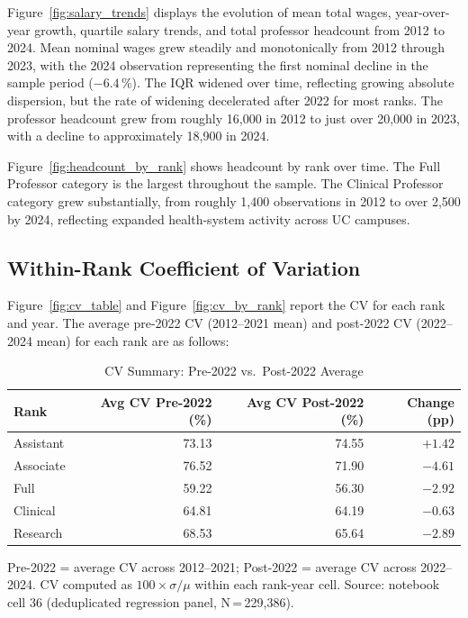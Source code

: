 \documentclass[12pt]{article}
\begin{document}
Figure~\ref{fig:salary_trends} displays the evolution of mean total
wages, year-over-year growth, quartile salary trends, and total professor
headcount from 2012 to 2024. Mean nominal wages grew steadily and
monotonically from 2012 through 2023, with the 2024 observation
representing the first nominal decline in the sample period ($-6.4$\,\%).
The IQR widened over time, reflecting growing absolute dispersion, but
the rate of widening decelerated after 2022 for most ranks. The
professor headcount grew from roughly 16,000 in 2012 to just over 20,000
in 2023, with a decline to approximately 18,900 in 2024.

Figure~\ref{fig:headcount_by_rank} shows headcount by rank over time.
The Full Professor category is the largest throughout the sample. The
Clinical Professor category grew substantially, from roughly 1,400
observations in 2012 to over 2,500 by 2024, reflecting expanded
health-system activity across UC campuses.

\subsection{Within-Rank Coefficient of Variation}
\label{subsec:cv}

Figure~\ref{fig:cv_table} and Figure~\ref{fig:cv_by_rank} report the CV for
each rank and year. The average pre-2022 CV (2012--2021 mean) and
post-2022 CV (2022--2024 mean) for each rank are as follows:

\begin{table}[H]
\centering
\caption{CV Summary: Pre-2022 vs.\ Post-2022 Average}
\label{tab:cv_summary}
\begin{tabular}{lrrr}
\toprule
Rank & Avg CV Pre-2022 (\%) & Avg CV Post-2022 (\%) & Change (pp) \\
\midrule
Assistant  & 73.13 & 74.55 & $+1.42$ \\
Associate  & 76.52 & 71.90 & $-4.61$ \\
Full       & 59.22 & 56.30 & $-2.92$ \\
Clinical   & 64.81 & 64.19 & $-0.63$ \\
Research   & 68.53 & 65.64 & $-2.89$ \\
\bottomrule
\end{tabular}
\begin{flushleft}
\small Pre-2022 = average CV across 2012--2021; Post-2022 = average CV
across 2022--2024. CV computed as $100 \times \sigma / \mu$ within each
rank-year cell. Source: notebook cell 36 (deduplicated regression panel, N\,=\,229,386).
\end{flushleft}
\end{table}
\end{document}
